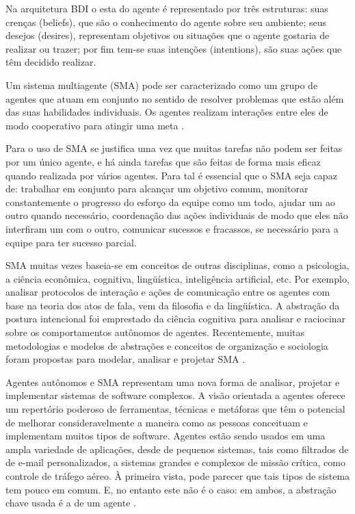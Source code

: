 Na arquitetura BDI o esta do agente é representado por três estruturas: suas crenças (beliefs), que são o conhecimento do agente sobre seu ambiente; seus desejos (desires), representam objetivos ou situações que o agente gostaria de realizar ou trazer; por fim tem-se suas intenções (intentions), são suas ações que têm decidido realizar\cite[pág.~3]{girardi2004}.

Um sistema multiagente (SMA) pode ser caracterizado como um grupo de agentes que atuam em conjunto no sentido de resolver problemas que estão além das suas habilidades individuais. Os agentes realizam interações entre eles de modo cooperativo para atingir uma meta \cite[pág.~6]{girardi2004}. 

Para  o uso de SMA se justifica uma vez que muitas tarefas não podem ser feitas por um único agente, e há ainda tarefas que são feitas de forma mais eficaz quando realizada por vários agentes. Para tal é essencial que o SMA seja capaz de:  trabalhar em conjunto para alcançar um objetivo comum, monitorar constantemente o progresso do esforço da equipe como um todo, ajudar um ao outro quando necessário, coordenação das ações individuais de modo que eles não interfiram um com o outro, comunicar sucessos e fracassos, se necessário para a equipe para ter sucesso parcial. 

SMA muitas vezes baseia-se em conceitos de outras disciplinas, como a psicologia, a ciência econômica, cognitiva, lingüística, inteligência artificial, etc. Por exemplo, analisar protocolos de interação e ações de comunicação entre os agentes com base na teoria dos atos de fala, vem da filosofia e da lingüística. A abstração da postura intencional foi emprestado da ciência cognitiva para analisar e raciocinar sobre os comportamentos autônomos de agentes. Recentemente, muitas metodologias e modelos de abstrações e conceitos de organização e sociologia foram propostas para modelar, analisar e projetar SMA \cite[pág.~1]{odell2005}.

Agentes autônomos e SMA representam uma nova forma de analisar, projetar e implementar sistemas de software complexos. A visão orientada a agentes oferece um repertório poderoso de ferramentas, técnicas e metáforas que têm o potencial de melhorar consideravelmente a maneira como as pessoas conceituam e implementam muitos tipos de software. Agentes estão sendo usados em uma ampla variedade de aplicações, desde de pequenos sistemas, tais como filtrados de de e-mail personalizados, a sistemas grandes e complexos de missão crítica, como controle de tráfego aéreo. À primeira vista, pode parecer que tais tipos de sistema tem pouco em comum. E, no entanto este não é o caso: em ambos, a abstração chave usada é a de um agente \cite{jennings1998}.


